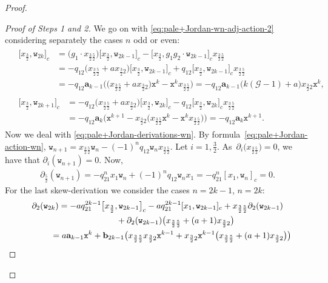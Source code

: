 \documentclass[10pt,a4paper]{amsart}
\numberwithin{equation}{section}
\newcommand{\ghost}{\mathscr{G}}
\newcommand{\ab}{\mathbf a}
\newcommand{\bb}{\mathbf b}
\newcommand{\wt}{\mathtt{w}}
\newcommand{\xt}{\mathtt{x}}
\newcommand{\tresdos}{\frac{3}{2}}
\newcommand{\cincodos}{\frac{5}{2}}
\begin{document}
\begin{proof}
\begin{proof}[Proof of Steps 1 and 2]
We go on with \eqref{eq:pale+Jordan-wn-adj-action-2} considering separately the cases $n$ odd or even:
\begin{align*}
&\begin{aligned}
\big[x_{\tresdos}, \wt_{2k}\big]_c &=
\big(g_1 \cdot x_{\tresdos\cincodos}\big)\big[x_{\tresdos},\wt_{2k-1}\big]_c -\big[x_{\tresdos},g_1g_2\cdot \wt_{2k-1}\big]_c x_{\tresdos\cincodos}
\\
&= -q_{12}\big(x_{\tresdos\cincodos}+ax_{\tresdos2}\big) \big[x_{\tresdos},\wt_{2k-1}\big]_c+q_{12} \big[x_{\tresdos},\wt_{2k-1}\big]_c x_{\tresdos\cincodos}
\\
&= -q_{12}\ab_{k-1} \big(\big(x_{\tresdos\cincodos}+ax_{\tresdos2}\big) \xt^{k} - \xt^{k}x_{\tresdos\cincodos}\big)
= -q_{12}\ab_{k-1} \big(k(\ghost-1)+a\big) x_{\tresdos2}\xt^{k},
\end{aligned}
\\
&\begin{aligned}
\big[x_{\tresdos}, \wt_{2k+1}\big]_c &= -q_{12}\big(x_{\tresdos\cincodos}+ax_{\tresdos2}\big) \big[x_{\tresdos},\wt_{2k}\big]_c -
q_{12} \big[x_{\tresdos},\wt_{2k}\big]_c x_{\tresdos\cincodos}
\\
&=-q_{12} \ab_k \big(\xt^{k+1} - x_{\tresdos2}\big(x_{\tresdos\cincodos}\xt^{k}
- \xt^{k} x_{\tresdos\cincodos}\big)\big) = -q_{12} \ab_k \xt^{k+1}.
\end{aligned}
\end{align*}
Now we deal with \eqref{eq:pale+Jordan-derivations-wn}. By formula~\eqref{eq:pale+Jordan-action-wn}, $\wt_{n+1}=x_{\tresdos\cincodos}\wt_n-(-1)^nq_{12} \wt_n x_{\tresdos\cincodos}$. Let $i=1,\tresdos$. As~${\partial_i\big(x_{\tresdos\cincodos}\big)=0}$, we have that $\partial_i(\wt_{n+1})=0$. Now,
\begin{align*}
\partial_{\cincodos} (\wt_{n+1}) = -q_{21}^n x_1 \wt_n+(-1)^nq_{12} \wt_n x_1
= -q_{21}^n [x_1, \wt_n]_c=0.
\end{align*}
For the last skew-derivation we consider the cases $n=2k-1$, $n=2k$:
\begin{gather*}
\partial_{2} (\wt_{2k})
= -aq_{21}^{2k-1}\big[x_{\tresdos},\wt_{2k-1}\big]_c -aq_{21}^{2k-1}[x_{1},\wt_{2k-1}]_c
+x_{\tresdos\cincodos}\partial_2(\wt_{2k-1})
\\ \hphantom{\partial_{2} (\wt_{2k})= }
{}+ \partial_2(\wt_{2k-1}) \big(x_{\tresdos\cincodos}+(a+1)x_{\tresdos2}\big)
\\ \hphantom{\partial_{2} (\wt_{2k})}
{}= a\ab_{k-1} \xt^{k} +\bb_{2k-1} \big(x_{\tresdos\cincodos}x_{\tresdos2}\xt^{k-1}+x_{\tresdos2}\xt^{k-1} \big(x_{\tresdos\cincodos}+(a+1)x_{\tresdos2}\big)\big)

\end{gather*}
\end{proof}
\end{proof}
\end{document}
